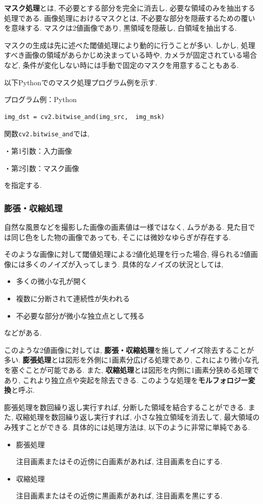 \documentclass[dvipdfmx]{jsarticle}
\begin{document}
\textbf{マスク処理}とは, 不必要とする部分を完全に消去し, 必要な領域のみを抽出する処理である.
画像処理におけるマスクとは, 不必要な部分を隠蔽するための覆いを意味する.
マスクは2値画像であり, 黒領域を隠蔽し, 白領域を抽出する.

マスクの生成は先に述べた閾値処理により動的に行うことが多い.
しかし, 処理すべき画像の領域があらかじめ決まっている時や, カメラが固定されている場合など, 条件が変化しない時には手動で固定のマスクを用意することもある.

以下Pythonでのマスク処理プログラム例を示す.

プログラム例：Python
\begin{lstlisting}
img_dst = cv2.bitwise_and(img_src,  img_msk)
\end{lstlisting}

関数\verb|cv2.bitwise_and|では, 


・第1引数：入力画像

・第2引数：マスク画像

を指定する.

\subsubsection{膨張・収縮処理}
自然な風景などを撮影した画像の画素値は一様ではなく, ムラがある.
見た目では同じ色をした物の画像であっても, そこには微妙なゆらぎが存在する.

そのような画像に対して閾値処理による2値化処理を行った場合, 得られる2値画像には多くのノイズが入ってしまう.
具体的なノイズの状況としては, 
\begin{itemize}
    \item 多くの微小な孔が開く
    \item 複数に分断されて連続性が失われる
    \item 不必要な部分が微小な独立点として残る
    
\end{itemize}

などがある.

このような2値画像に対しては, \textbf{膨張・収縮処理}を施してノイズ除去することが多い.
\textbf{膨張処理}とは図形を外側に1画素分広げる処理であり, これにより微小な孔を塞ぐことが可能である.
また, \textbf{収縮処理}とは図形を内側に1画素分狭める処理であり, これより独立点や突起を除去できる.
このような処理を\textbf{モルフォロジー変換}と呼ぶ.

膨張処理を数回繰り返し実行すれば, 分断した領域を結合することができる.
また, 収縮処理を数回繰り返し実行すれば, 小さな独立領域を消去して, 最大領域のみ残すことができる.
具体的には処理方法は, 以下のように非常に単純である.
\begin{itemize}
    \item 膨張処理

    注目画素またはその近傍に白画素があれば, 注目画素を白にする.

    \item 収縮処理

    注目画素またはその近傍に黒画素があれば, 注目画素を黒にする.
\end{itemize}
\end{document}

